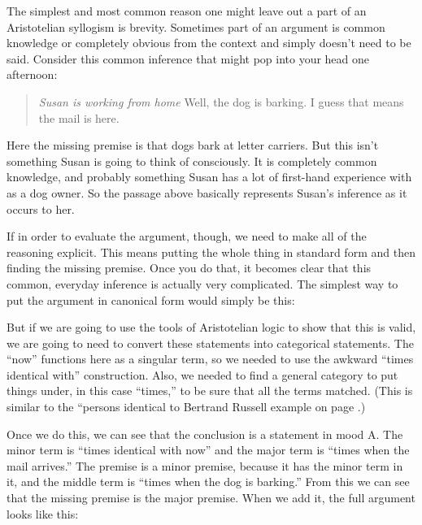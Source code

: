 The simplest and most common reason one might leave out a part of an Aristotelian syllogism is brevity. Sometimes part of an argument is common knowledge or completely obvious from the context and simply doesn't need to be said. Consider this common inference that might pop into your head one afternoon:

\begin{quotation} \noindent \textit{Susan is working from home} Well, the dog is barking. I guess that means the mail is here.\end{quotation}

Here the missing premise is that dogs bark at letter carriers. But this isn't something Susan is going to think of consciously. It is completely common knowledge, and probably something Susan has a lot of first-hand experience with as a dog owner. So the passage above basically represents Susan's inference as it occurs to her.

If in order to evaluate the argument, though, we need to make all of the reasoning explicit. This means putting the whole thing in standard form and then finding the missing premise. Once you do that, it becomes clear that this common, everyday inference is actually very complicated. The simplest way to put the argument in canonical form would simply be this:

\begin{kormanize}
\end{kormanize}

But if we are going to use the tools of Aristotelian logic to show that this is valid, we are going to need to convert these statements into categorical statements. The ``now'' functions here as a singular term, so we needed to use the awkward ``times identical with'' construction. Also, we needed to find a general category to put things under, in this case ``times,'' to be sure that all the terms matched. (This is similar to the ``persons identical to Bertrand Russell example on page \pageref{finding_general_terms}.)

\begin{kormanize}
\end{kormanize}

Once we do this, we can see that the conclusion is a statement in mood A. The minor term is ``times identical with now'' and the major term is ``times when the mail arrives.'' The premise is a minor premise, because it has the minor term in it, and the middle term is ``times when the dog is barking.'' From this we can see that the missing premise is the major premise. When we add it, the full argument looks like this:

